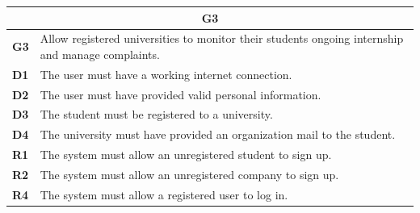 \begin{table}[H]
    \centering
    \begin{tabular}{|l|m{10cm}|}
        \hline \multicolumn{2}{|c|}{\textbf{G3}} \\
        \hline \textbf{G3} & Allow registered universities to monitor their students ongoing internship and manage complaints. \\
        \hline \textbf{D1} & The user must have a working internet connection. \\
        \hline \textbf{D2} & The user must have provided valid personal information. \\
        \hline \textbf{D3} & The student must be registered to a university. \\
        \hline \textbf{D4} & The university must have provided an organization mail to the student. \\
        \hline \textbf{R1} & The system must allow an unregistered student to sign up.\\
        \hline \textbf{R2} & The system must allow an unregistered company to sign up. \\
        \hline \textbf{R4} & The system must allow a registered user to log in. \\

\end{tabular}
\end{table}
